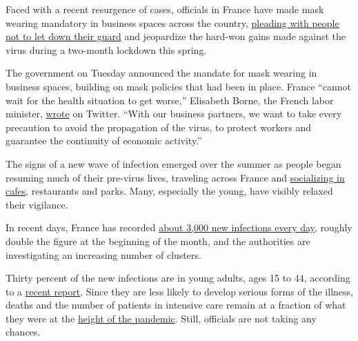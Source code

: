 Faced with a recent resurgence of cases, officials in France have made
mask wearing mandatory in business spaces across the country,
\href{https://www.nytimes3xbfgragh.onion/2020/08/17/world/europe/france-coronavirus.html}{pleading
with people not to let down their guard} and jeopardize the hard-won
gains made against the virus during a two-month lockdown this spring.

The government on Tuesday announced the mandate for mask wearing in
business spaces, building on mask policies that had been in place.
France ``cannot wait for the health situation to get worse,'' Elisabeth
Borne, the French labor minister,
\href{https://twitter.com/Elisabeth_Borne/status/1295727473448161282}{wrote}
on Twitter. ``With our business partners, we want to take every
precaution to avoid the propagation of the virus, to protect workers and
guarantee the continuity of economic activity.''

The signs of a new wave of infection emerged over the summer as people
began resuming much of their pre-virus lives, traveling across France
and
\href{https://www.nytimes3xbfgragh.onion/2020/06/02/world/europe/coronavirus-paris-cafe-reopen-france.html}{socializing
in cafes}, restaurants and parks. Many, especially the young, have
visibly relaxed their vigilance.

In recent days, France has recorded
\href{https://www.nytimes3xbfgragh.onion/interactive/2020/world/europe/france-coronavirus-cases.html}{about
3,000 new infections every day}, roughly double the figure at the
beginning of the month, and the authorities are investigating an
increasing number of clusters.

Thirty percent of the new infections are in young adults, ages 15 to 44,
according to a
\href{https://www.santepubliquefrance.fr/maladies-et-traumatismes/maladies-et-infections-respiratoires/infection-a-coronavirus/documents/bulletin-national/covid-19-point-epidemiologique-du-13-aout-2020}{recent
report}. Since they are less likely to develop serious forms of the
illness, deaths and the number of patients in intensive care remain at a
fraction of what they were at the
\href{https://www.nytimes3xbfgragh.onion/2020/05/17/world/europe/france-coronavirus.html?searchResultPosition=6}{height
of the pandemic}. Still, officials are not taking any chances.

\href{https://www.nytimes3xbfgragh.onion/news-event/coronavirus?action=click\&pgtype=Article\&state=default\&region=MAIN_CONTENT_3\&context=storylines_faq}{}

